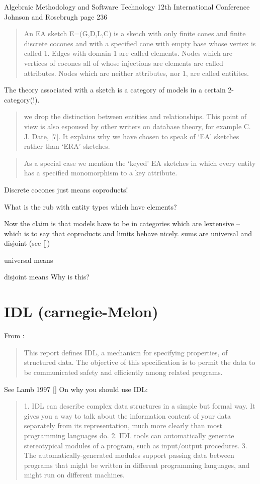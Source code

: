 \documentclass[10pt,a4paper]{scrartcl}
\begin{document}
Algebraic Methodology and Software Technology 12th International Conference Johnson and Rosebrugh page 236
\begin{quote}
An EA sketch E=(G,D,L,C) is a sketch with only finite cones and finite discrete cocones and with a 
specified cone with empty base whose vertex is called 1. Edges with domain 1 are called elements. 
Nodes which are vertices of cocones all of whose injections are elements are called attributes. 
Nodes which are neither attributes, nor 1, are called entitites.
\end{quote}
The theory associated with a sketch is a category of models in a certain 2-category(!).
\begin{quote}
we drop the distinction between entities and relationships. This point of view is also
espoused by other writers on database theory, for example C. J. Date, [7]. It explains
why we have chosen to speak of `EA' sketches rather than `ERA' sketches.
\end{quote}
\begin{quote}
As a special case we mention the `keyed' EA sketches in which every entity has
a specified monomorphism to a key attribute.
\end{quote}
Discrete cocones just means coproducts!

What is the rub with entity types which have elements?

Now the claim is that models have to be in categories which are lextensive -- which is to say
that coproducts and limits behave nicely. sums are universal and disjoint (see [\cite {Carboni1993}])

universal means

disjoint means 
Why is this?

\section{IDL (carnegie-Melon)}

From \cite{Nestor1981}:

\begin{quote}
This report defines IDL, a mechanism for specifying properties, of structured data. The objective of this
specification is to permit the data to be communicated safety and efficiently among related programs.
\end{quote}

See Lamb 1997 [\cite{Lamb1997}]
On why you should use IDL:
\begin{quote}
1. IDL can describe complex data structures in a simple but formal way.
It gives you a way to talk about the information content of your data
separately from its representation, much more clearly than most programming 
languages do.
2. IDL tools can automatically generate stereotypical modules of a program,
such as input/output procedures.
3. The automatically-generated modules support passing data between programs 
that might be written in different programming languages, and
might run on different machines.
\end{quote}
\end{document}
